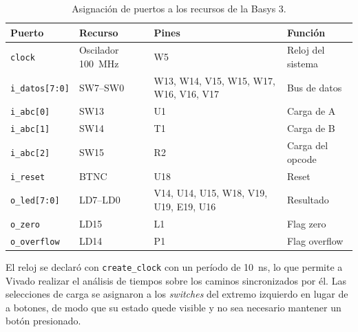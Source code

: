 \begin{table}[H]
	\centering
	\caption{Asignación de puertos a los recursos de la Basys 3.}
	\label{tab:pines}
	\begin{tabularx}{\textwidth}{llYl}
		\toprule
		\textbf{Puerto} & \textbf{Recurso} & \textbf{Pines} & \textbf{Función} \\
		\midrule
		\texttt{clock} & Oscilador 100~MHz & W5 & Reloj del sistema \\
		\texttt{i\_datos[7:0]} & SW7--SW0 & W13, W14, V15, W15, W17, W16, V16, V17 & Bus de datos \\
		\texttt{i\_abc[0]} & SW13 & U1 & Carga de A \\
		\texttt{i\_abc[1]} & SW14 & T1 & Carga de B \\
		\texttt{i\_abc[2]} & SW15 & R2 & Carga del opcode \\
		\texttt{i\_reset} & BTNC & U18 & Reset \\
		\texttt{o\_led[7:0]} & LD7--LD0 & V14, U14, U15, W18, V19, U19, E19, U16 & Resultado \\
		\texttt{o\_zero} & LD15 & L1 & Flag zero \\
		\texttt{o\_overflow} & LD14 & P1 & Flag overflow \\
		\bottomrule
	\end{tabularx}
\end{table}

El reloj se declaró con \texttt{create\_clock} con un período de 10~ns, lo que permite a Vivado realizar el análisis de tiempos sobre los caminos sincronizados por él. Las selecciones de carga se asignaron a los \textit{switches} del extremo izquierdo en lugar de a botones, de modo que su estado quede visible y no sea necesario mantener un botón presionado.
